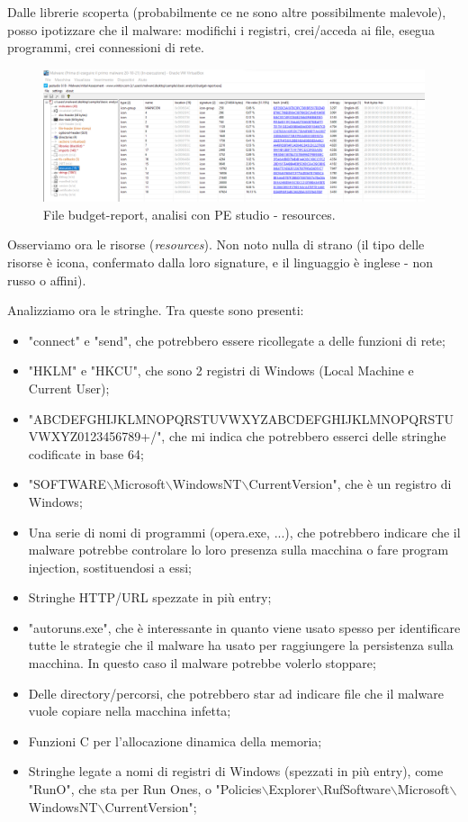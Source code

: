 \documentclass[a4paper]{book}
\begin{document}
Dalle librerie scoperta (probabilmente ce ne sono altre possibilmente malevole), posso ipotizzare che il malware: modifichi i registri, crei/acceda ai file, esegua programmi, crei connessioni di rete.

\begin{figure}[p]
    \includegraphics[width=1\textwidth]{images/13-10/8.png}
    \caption{File budget-report, analisi con PE studio - resources.}
\end{figure}

Osserviamo ora le risorse (\textit{resources}). Non noto nulla di strano (il tipo delle risorse è icona, confermato dalla loro signature, e il linguaggio è inglese - non russo o affini). 

Analizziamo ora le stringhe. Tra queste sono presenti:
\begin{itemize}
    \item "connect" e "send", che  potrebbero essere ricollegate a delle funzioni di rete;
    \item "HKLM" e "HKCU", che sono 2 registri di Windows (Local Machine e Current User);
    \item "ABCDEFGHIJKLMNOPQRSTUVWXYZABCDEFGHIJKLMNOPQRSTUVWXYZ0123456789+/", che mi indica che potrebbero esserci delle stringhe codificate in base 64;
    \item "SOFTWARE$\backslash$Microsoft$\backslash$WindowsNT$\backslash$CurrentVersion", che è un registro di Windows;
    \item Una serie di nomi di programmi (opera.exe, ...), che potrebbero indicare che il malware potrebbe controlare lo loro presenza sulla macchina o fare program injection, sostituendosi a essi;
    \item Stringhe HTTP/URL spezzate in più entry;
    \item "autoruns.exe", che è interessante in quanto viene usato spesso per identificare tutte le strategie che il malware ha usato per raggiungere la persistenza sulla macchina. In questo caso il malware potrebbe volerlo stoppare;
    \item Delle directory/percorsi, che potrebbero star ad indicare file che il malware vuole copiare nella macchina infetta;
    \item Funzioni C per l'allocazione dinamica della memoria;
    \item Stringhe legate a nomi di registri di Windows (spezzati in più entry), come "RunO", che sta per Run Ones, o "Policies$\backslash$Explorer$\backslash$RufSoftware$\backslash$Microsoft$\backslash$WindowsNT$\backslash$CurrentVersion";
\end{itemize}
\end{document}
